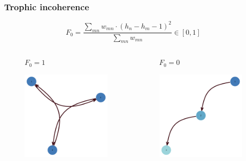\documentclass{beamer}
\begin{document}
\begin{frame}
    \frametitle{Trophic incoherence}
    \begin{equation}
        F_0 = \frac{\sum_{mn} w_{mn} \cdot (h_n - h_m - 1)^2}{\sum_{mn} w_{mn}} \in [0, 1]
    \end{equation}
    \begin{columns}
        \begin{column}{.49\textwidth}
            \begin{figure}
                \textbf{$F_0 = 1$}\par\medskip
                \includegraphics[width=0.8\linewidth,height=0.8\textheight,keepaspectratio]{../../plots/presentations/lv-network-coherent.png}
            \end{figure}
        \end{column}
        \begin{column}{.49\textwidth}
            \begin{figure}
                \textbf{$F_0 = 0$}\par\medskip
                \includegraphics[width=0.8\linewidth,height=0.8\textheight,keepaspectratio]{../../plots/presentations/lv-network-incoherent.png}

\end{figure}
\end{column}
\end{columns}
\end{frame}
\end{document}
